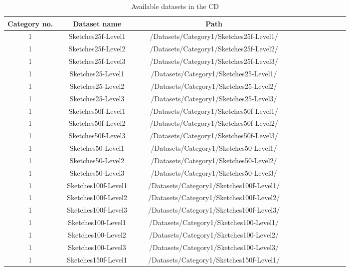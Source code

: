 \begin{table}[H]
\centering
\caption[List of all datasets available in the CD]{Available datasets in the CD}
\begin{tabular}{ccccccccccccccc}
  \hline
      Category no. & & Dataset name & & & Path \\
  \hline
  
      1 & & Sketches25f-Level1 & & & /Datasets/Category1/Sketches25f-Level1/  \\
      1 & & Sketches25f-Level2 & & & /Datasets/Category1/Sketches25f-Level2/  \\
      1 & & Sketches25f-Level3 & & & /Datasets/Category1/Sketches25f-Level3/  \\
      1 & & Sketches25-Level1  & & & /Datasets/Category1/Sketches25-Level1/  \\
      1 & & Sketches25-Level2  & & & /Datasets/Category1/Sketches25-Level2/  \\
      1 & & Sketches25-Level3  & & & /Datasets/Category1/Sketches25-Level3/  \\
      1 & & Sketches50f-Level1 & & & /Datasets/Category1/Sketches50f-Level1/ \\
      1 & & Sketches50f-Level2 & & & /Datasets/Category1/Sketches50f-Level2/  \\
      1 & & Sketches50f-Level3 & & & /Datasets/Category1/Sketches50f-Level3/  \\
      1 & & Sketches50-Level1  & & & /Datasets/Category1/Sketches50-Level1/  \\
      1 & & Sketches50-Level2  & & & /Datasets/Category1/Sketches50-Level2/  \\
      1 & & Sketches50-Level3  & & & /Datasets/Category1/Sketches50-Level3/  \\      
      1 & & Sketches100f-Level1 & & & /Datasets/Category1/Sketches100f-Level1/  \\
      1 & & Sketches100f-Level2 & & & /Datasets/Category1/Sketches100f-Level2/  \\
      1 & & Sketches100f-Level3 & & & /Datasets/Category1/Sketches100f-Level3/  \\
      1 & & Sketches100-Level1 & & & /Datasets/Category1/Sketches100-Level1/  \\
      1 & & Sketches100-Level2 & & & /Datasets/Category1/Sketches100-Level2/  \\
      1 & & Sketches100-Level3 & & & /Datasets/Category1/Sketches100-Level3/  \\      
      1 & & Sketches150f-Level1 & & & /Datasets/Category1/Sketches150f-Level1/   \\
  \hline
\end{tabular}
\end{table}
\vspace{49.3mm}



